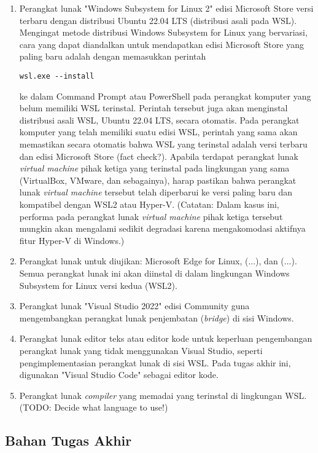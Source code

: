 \begin{enumerate}
    \item Perangkat lunak "Windows Subsystem for Linux 2" edisi Microsoft Store versi terbaru dengan distribusi Ubuntu 22.04 LTS (distribusi asali pada WSL). Mengingat metode distribusi Windows Subsystem for Linux yang bervariasi, cara yang dapat diandalkan untuk mendapatkan edisi Microsoft Store yang paling baru adalah dengan memasukkan perintah \begin{verbatim}wsl.exe --install\end{verbatim} ke dalam Command Prompt atau PowerShell pada perangkat komputer yang belum memiliki WSL terinstal. Perintah tersebut juga akan menginstal distribusi asali WSL, Ubuntu 22.04 LTS, secara otomatis. Pada perangkat komputer yang telah memiliki suatu edisi WSL, perintah yang sama akan memastikan secara otomatis bahwa WSL yang terinstal adalah versi terbaru dan edisi Microsoft Store (fact check?). Apabila terdapat perangkat lunak \textit{virtual machine} pihak ketiga yang terinstal pada lingkungan yang sama (VirtualBox, VMware, dan sebagainya), harap pastikan bahwa perangkat lunak \textit{virtual machine} tersebut telah diperbarui ke versi paling baru dan kompatibel dengan WSL2 atau Hyper-V. (Catatan: Dalam kasus ini, performa pada perangkat lunak \textit{virtual machine} pihak ketiga tersebut mungkin akan mengalami sedikit degradasi karena mengakomodasi aktifnya fitur Hyper-V di Windows.)
    \item Perangkat lunak untuk diujikan: Microsoft Edge for Linux, (...), dan (...). Semua perangkat lunak ini akan diinstal di dalam lingkungan Windows Subsystem for Linux versi kedua (WSL2).

    \item Perangkat lunak "Visual Studio 2022" edisi Community guna mengembangkan perangkat lunak penjembatan (\textit{bridge}) di sisi Windows.

    \item Perangkat lunak editor teks atau editor kode untuk keperluan pengembangan perangkat lunak yang tidak menggunakan Visual Studio, seperti pengimplementasian perangkat lunak di sisi WSL. Pada tugas akhir ini, digunakan "Visual Studio Code" sebagai editor kode.

    \item Perangkat lunak \textit{compiler} yang memadai yang terinstal di lingkungan WSL. (TODO: Decide what language to use!)
\end{enumerate}

\subsection{Bahan Tugas Akhir}

